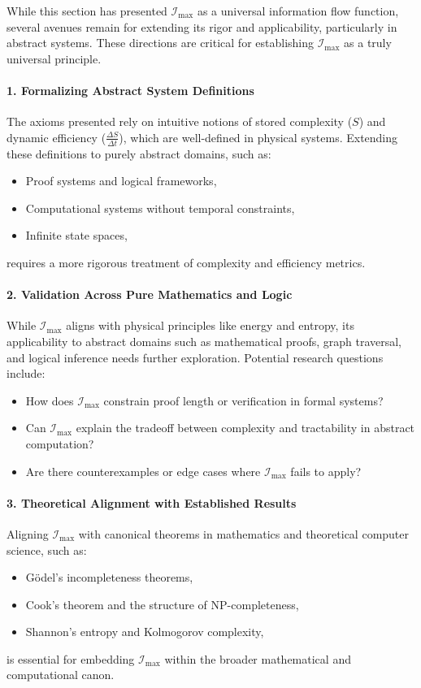 \documentclass[12pt]{article}
\begin{document}
While this section has presented \(\mathcal{I}_{\text{max}}\) as a universal information flow function, several avenues remain for extending its rigor and applicability, particularly in abstract systems. These directions are critical for establishing \(\mathcal{I}_{\text{max}}\) as a truly universal principle.

\paragraph{1. Formalizing Abstract System Definitions}
The axioms presented rely on intuitive notions of stored complexity (\(S\)) and dynamic efficiency (\(\frac{\Delta S}{\Delta t}\)), which are well-defined in physical systems. Extending these definitions to purely abstract domains, such as:
\begin{itemize}
    \item Proof systems and logical frameworks,
    \item Computational systems without temporal constraints,
    \item Infinite state spaces,
\end{itemize}
requires a more rigorous treatment of complexity and efficiency metrics.

\paragraph{2. Validation Across Pure Mathematics and Logic}
While \(\mathcal{I}_{\text{max}}\) aligns with physical principles like energy and entropy, its applicability to abstract domains such as mathematical proofs, graph traversal, and logical inference needs further exploration. Potential research questions include:
\begin{itemize}
    \item How does \(\mathcal{I}_{\text{max}}\) constrain proof length or verification in formal systems?
    \item Can \(\mathcal{I}_{\text{max}}\) explain the tradeoff between complexity and tractability in abstract computation?
    \item Are there counterexamples or edge cases where \(\mathcal{I}_{\text{max}}\) fails to apply?
\end{itemize}

\paragraph{3. Theoretical Alignment with Established Results}
Aligning \(\mathcal{I}_{\text{max}}\) with canonical theorems in mathematics and theoretical computer science, such as:
\begin{itemize}
    \item Gödel’s incompleteness theorems,
    \item Cook’s theorem and the structure of NP-completeness,
    \item Shannon’s entropy and Kolmogorov complexity,
\end{itemize}
is essential for embedding \(\mathcal{I}_{\text{max}}\) within the broader mathematical and computational canon.
\end{document}

